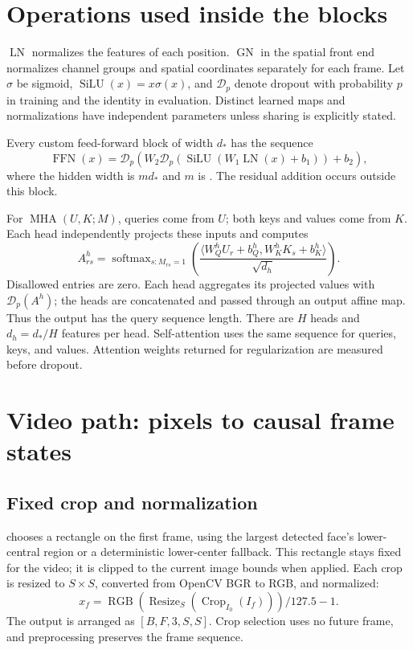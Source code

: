 \documentclass[11pt,a4paper]{article}
\newcommand{\LN}{\operatorname{LN}}
\newcommand{\GN}{\operatorname{GN}}
\newcommand{\MHA}{\operatorname{MHA}}
\newcommand{\FFN}{\operatorname{FFN}}
\newcommand{\silu}{\operatorname{SiLU}}
\newcommand{\softmax}{\operatorname{softmax}}
\newcommand{\code}[1]{\texttt{\detokenize{#1}}}
\numberwithin{equation}{section}
\begin{document}
\section{Operations used inside the blocks}
\label{sec:primitives}

$\LN$ normalizes the features of each position. $\GN$ in the spatial
front end normalizes channel groups and spatial coordinates separately
for each frame. Let $\sigma$ be sigmoid, $\silu(x)=x\sigma(x)$, and
$\mathcal D_p$ denote dropout with probability $p$ in training and the
identity in evaluation. Distinct learned maps and normalizations have
independent parameters unless sharing is explicitly stated.

Every custom feed-forward block of width $d_*$ has the sequence
\begin{equation}
\FFN(x)=\mathcal D_p\!\left(
 W_2\mathcal D_p\!\left(\silu(W_1\LN(x)+b_1)\right)+b_2\right),
\end{equation}
where the hidden width is $m d_*$ and $m$ is \code{ff_mult}.
The residual addition occurs outside this block.

For $\MHA(U,K;M)$, queries come from $U$; both keys and values come
from $K$. Each head independently projects these inputs and computes
\begin{equation}
A^h_{rs}=\softmax_{s:M_{rs}=1}
 \left(\frac{\langle W_Q^hU_r+b_Q^h,
 W_K^hK_s+b_K^h\rangle}{\sqrt{d_h}}\right).
\end{equation}
Disallowed entries are zero. Each head aggregates its projected values
with $\mathcal D_p(A^h)$; the heads are concatenated and passed through
an output affine map. Thus the output has the query sequence length.
There are $H$ heads and $d_h=d_*/H$ features per head. Self-attention
uses the same sequence for queries, keys, and values. Attention weights
returned for regularization are measured before dropout.

\section{Video path: pixels to causal frame states}
\label{sec:video}

\subsection{Fixed crop and normalization}

\code{FixedMouthCropper} chooses a rectangle on the first frame, using
the largest detected face's lower-central region or a deterministic
lower-center fallback. This rectangle stays fixed for the video; it is
clipped to the current image bounds when applied. Each crop is resized
to $S\times S$, converted from OpenCV BGR to RGB, and normalized:
\begin{equation}
x_f=\operatorname{RGB}\!\left(\operatorname{Resize}_S(
\operatorname{Crop}_{I_0}(I_f))\right)/127.5-1.
\end{equation}
The output is arranged as $[B,F,3,S,S]$. Crop selection uses no future
frame, and preprocessing preserves the frame sequence.
\end{document}
